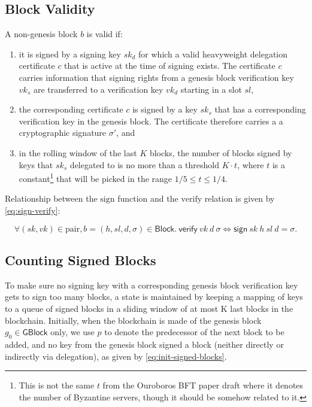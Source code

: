\documentclass[11pt,a4paper]{article}
\newcommand{\var}[1]{\mathit{#1}}
\newcommand{\fun}[1]{\mathsf{#1}}
\newcommand{\type}[1]{\mathsf{#1}}
\newcommand{\GBlock}{\type{GBlock}}
\newcommand{\Block}{\type{Block}}
\newcommand{\signname}{sign}
\newcommand{\verifyname}{verify}
\newcommand{\keypairname}{pair}
\newcommand{\sign}[4]{\fun{\signname}\ #1 ~ #2 ~ #3 ~ #4}
\newcommand{\verify}[3]{\fun{\verifyname} ~ #1 ~ #2 ~ #3}
\begin{document}
\subsection{Block Validity}
\label{sec:block-valid}

A non-genesis block $\var{b}$ is valid if:
%
\begin{enumerate}
\item it is signed by a signing key $sk_d$ for which a valid heavyweight
  delegation certificate $c$ that is active at the time of signing exists.
  The certificate $c$ carries information that signing rights from a genesis
  block verification key $vk_s$ are transferred to a verification key $vk_d$
  starting in a slot $sl$,
\item the corresponding certificate $c$ is signed by a key $sk_s$ that has a
  corresponding verification key in the genesis block.
  The certificate therefore carries a a cryptographic signature $\sigma'$,
  and
\item in the rolling window of the last $K$ blocks, the number of blocks
  signed by keys that $sk_s$ delegated to is no more than a threshold
  $K \cdot t$, where $t$ is a constant\footnote{This is not the same $t$ from
    the Ouroboros BFT paper draft where it denotes the number of Byzantine
    servers, though it should be somehow related to it.}  that will be picked
  in the range $1/5 \leq t \leq 1/4$.
\end{enumerate}

Relationship between the $\text{\signname}$ function and the
$\text{\verifyname}$ relation is given by \eqref{eq:sign-verify}:

\begin{equation}
  \label{eq:sign-verify}
  \forall (sk, vk) \in \text{\keypairname}, b = (h, sl, d, \sigma) \in \Block.\
  \verify{vk}{d}{\sigma} \iff \sign{sk}{h}{sl}{d} = \sigma.
\end{equation}


\subsection{Counting Signed Blocks}
\label{sec:counting-signed-blocks}

To make sure no signing key with a corresponding genesis block verification
key gets to sign too many blocks, a state is maintained by keeping a mapping
of keys to a queue of signed blocks in a sliding window of at most K last
blocks in the blockchain.
%
Initially, when the blockchain is made of the genesis block $g_0 \in \GBlock$
only, we use $p$ to denote the predecessor of the next block to be added, and
no key from the genesis block signed a block (neither directly or indirectly
via delegation), as given by \eqref{eq:init-signed-blocks}.
\end{document}
